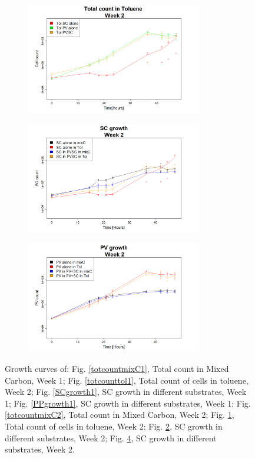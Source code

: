 \documentclass[a4paper, 10pt, conference]{ieeeconf}   %
\begin{document}
\begin{landscape}
\begin{figure}
\begin{subfigure}{.47\textheight}
			\includegraphics[width=7.71cm]{totcount_tol2.png}
			\caption{}
			\label{totcounttol2}
		\end{subfigure}%
		\begin{subfigure}{.47\textheight}
			\centering
			\vspace{-0cm}	
			\includegraphics[width=7.71cm]{SCgrowth2.png}
			\caption{}
			\label{SCgrowth2}
		\end{subfigure}%
		\begin{subfigure}{.47\textheight}
			\centering
			\vspace{-0cm}
			\includegraphics[width=7.71cm]{PVgrowth2.png}
			\caption{}
			\label{PVgrowth2}
		\end{subfigure}
		
		\caption{ Growth curves of: Fig. \ref{totcountmixC1}, Total count in Mixed Carbon, Week 1; Fig. \ref{totcounttol1}, Total count of cells in toluene, Week 2; Fig. \ref{SCgrowth1}, SC growth in different substrates, Week 1; Fig. \ref{PPgrowth1}, SC growth in different substrates, Week 1; Fig. \ref{totcountmixC2}, Total count in Mixed Carbon, Week 2; Fig. \ref{totcounttol2}, Total count of cells in toluene, Week 2; Fig. \ref{SCgrowth2}, SC growth in different substrates, Week 2; Fig. \ref{PVgrowth2}, SC growth in different substrates, Week 2.}
		
		
	\end{figure}
\end{landscape}
\end{document}
